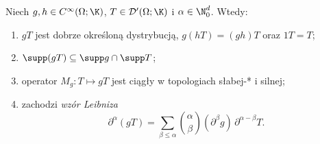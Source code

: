 \begin{twierdzenie}
\label{thm:multiply20}
Niech $g,h\in C^\infty(\Omega;\K)$, $T\in\mathcal D'(\Omega;\K)$
i $\alpha\in\N_0^d$. Wtedy:
\begin{enumerate}
\item $gT$ jest dobrze określoną dystrybucją,
$g(hT)=(gh)T$ oraz $1T=T$;
\item $\supp(gT)\subseteq\supp g\cap\supp T$;
\item operator $M_g:T\mapsto gT$ jest ciągły w topologiach
słabej-* i silnej;
\item zachodzi \emph{wzór Leibniza}
\[
 \partial^\alpha(gT)=
 \sum_{\beta\le\alpha}\binom\alpha\beta
 (\partial^\beta g)\,\partial^{\alpha-\beta}T.
\]
\end{enumerate}
\end{twierdzenie}
